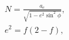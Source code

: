 \documentclass[10pt]{article}
\begin{document}
\begin{align*}&  N = \frac{ a_{e} }{ \sqrt{1 - e^2 \sin^2 \phi } }, \\
&  e^2 = f (2-f),\end{align*}
\end{document}
